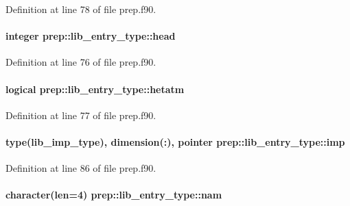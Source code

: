 Definition at line 78 of file prep.\-f90.

\hypertarget{structprep_1_1lib__entry__type_a9004ff4fe24d46b7e0ccbb20f243cd0d}{
\paragraph[{head}]{\setlength{\rightskip}{0pt plus 5cm}integer prep\-::lib\-\_\-entry\-\_\-type\-::head}}\label{structprep_1_1lib__entry__type_a9004ff4fe24d46b7e0ccbb20f243cd0d}


Definition at line 76 of file prep.\-f90.

\hypertarget{structprep_1_1lib__entry__type_a068ffb62d74c9d6050433868c5d2fb44}{
\paragraph[{hetatm}]{\setlength{\rightskip}{0pt plus 5cm}logical prep\-::lib\-\_\-entry\-\_\-type\-::hetatm}}\label{structprep_1_1lib__entry__type_a068ffb62d74c9d6050433868c5d2fb44}


Definition at line 77 of file prep.\-f90.

\hypertarget{structprep_1_1lib__entry__type_a84249dbd497a66b7abd53d63868d2fda}{
\paragraph[{imp}]{\setlength{\rightskip}{0pt plus 5cm}type({\bf lib\-\_\-imp\-\_\-type}), dimension(\-:), pointer prep\-::lib\-\_\-entry\-\_\-type\-::imp}}\label{structprep_1_1lib__entry__type_a84249dbd497a66b7abd53d63868d2fda}


Definition at line 86 of file prep.\-f90.

\hypertarget{structprep_1_1lib__entry__type_a7f130172df5dca976aa918e5db585836}{
\paragraph[{nam}]{\setlength{\rightskip}{0pt plus 5cm}character(len=4) prep\-::lib\-\_\-entry\-\_\-type\-::nam}}\label{structprep_1_1lib__entry__type_a7f130172df5dca976aa918e5db585836}


